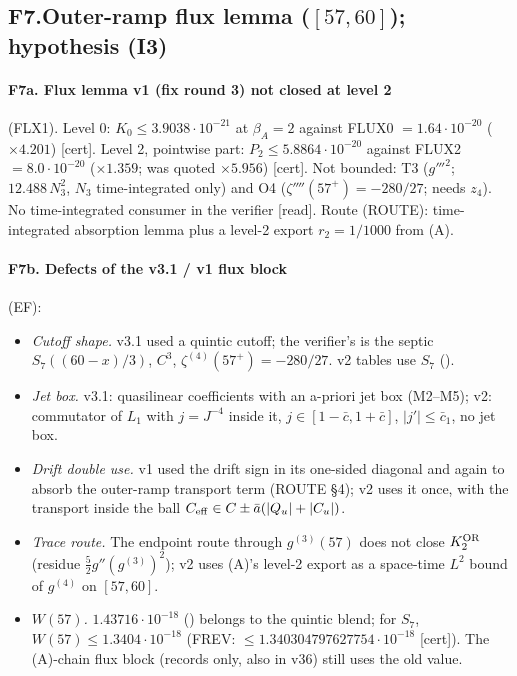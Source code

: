 \documentclass[10pt]{article}
\newcommand{\fn}[1]{\texttt{\detokenize{#1}}}
\newcommand{\cert}{\textup{[cert]}}
\newcommand{\rdlab}{\textup{[read]}}
\begin{document}
\subsection*{F7.\quad Outer-ramp flux lemma ($[57,60]$); hypothesis (I3)}
\paragraph{F7a. Flux lemma v1 (fix round 3) not closed at level 2} (FLX1). Level 0: $K_0\le3.9038\cdot10^{-21}$ at $\beta_A=2$ against FLUX0 $=1.64\cdot10^{-20}$ ($\times4.201$) \cert. Level 2, pointwise part: $P_2\le5.8864\cdot10^{-20}$ against FLUX2 $=8.0\cdot10^{-20}$ ($\times1.359$; was quoted $\times5.956$) \cert. Not bounded: T3 ($g'''^2$; $12.488\,N_3^2$, $N_3$ time-integrated only) and O4 ($\zeta''''(57^+)=-280/27$; needs $z_4$). No time-integrated consumer in the verifier \rdlab. Route (ROUTE): time-integrated absorption lemma plus a level-2 export $r_2=1/1000$ from (A).
\paragraph{F7b. Defects of the v3.1 / v1 flux block} (EF):
\begin{itemize}
\item[(E-F1)] \emph{Cutoff shape.} v3.1 used a quintic cutoff; the verifier's is the septic $S_7((60-x)/3)$, $C^3$, $\zeta^{(4)}(57^+)=-280/27$. v2 tables use $S_7$ (\fn{flux2_coef.py}).
\item[(E-F2)] \emph{Jet box.} v3.1: quasilinear coefficients with an a-priori jet box (M2--M5); v2: commutator of $L_1$ with $j=J^{-4}$ inside it, $j\in[1-\bar c,1+\bar c]$, $|j'|\le\bar c_1$, no jet box.
\item[(E-F3)] \emph{Drift double use.} v1 used the drift sign in its one-sided diagonal and again to absorb the outer-ramp transport term (ROUTE \S4); v2 uses it once, with the transport inside the ball $C_{\rm eff}\in C\pm\bar a(|Q_u|+|C_u|)$.
\item[(E-F4)] \emph{Trace route.} The endpoint route through $g^{(3)}(57)$ does not close $K_2^{\rm OR}$ (residue $\frac52g''(g^{(3)})^2$); v2 uses (A)'s level-2 export as a space-time $L^2$ bound of $g^{(4)}$ on $[57,60]$.
\item[(E-F5)] \emph{$W(57)$.} $1.43716\cdot10^{-18}$ (\fn{lemmaS_cflux.json}) belongs to the quintic blend; for $S_7$, $W(57)\le1.3404\cdot10^{-18}$ (FREV: $\le1.340304797627754\cdot10^{-18}$ \cert). The (A)-chain flux block (records only, also in v36) still uses the old value.
\end{itemize}
\end{document}
